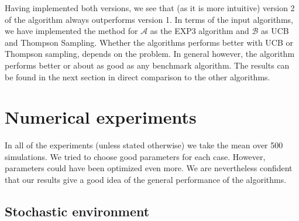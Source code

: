 \documentclass[10.5pt]{article}
\begin{document}
Having implemented both versions, we see that (as it is more intuitive) version 2 of the algorithm always outperforms version 1. In terms of the input algorithms, we have implemented the method for $\mathcal{A} $ as the EXP3 algorithm and $\mathcal{B}$ as UCB and Thompson Sampling. Whether the algorithms performs better with UCB or Thompson sampling, depends on the problem. In general however, the algorithm performs better or about as good as any benchmark algorithm. The results can be found in the next section in direct comparison to the other algorithms. 

\section*{Numerical experiments}

In all of the experiments (unless stated otherwise) we take the mean over 500 simulations. We tried to choose good parameters for each case. However, parameters could have been optimized even more. We are nevertheless confident that our results give a good idea of the general performance of the algorithms.

\subsection*{Stochastic environment}
\end{document}
